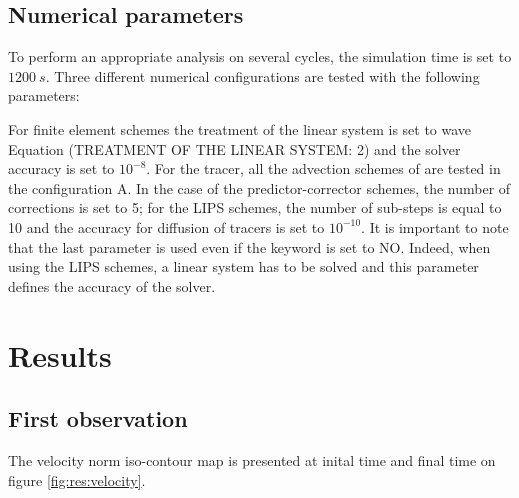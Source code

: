 \subsection{Numerical parameters}
\label{sec:num}
To perform an appropriate analysis on several cycles, the simulation time is set to $1200~s$.
Three different numerical configurations are tested with the following parameters:
\begin{table}[H]
  \caption{List of the simulation parameters used for the six cases tested in the Thacker example.}
  \label{tab:thacker:cases}
\end{table}

For finite element schemes the treatment of the linear system is set to wave Equation (TREATMENT OF THE LINEAR SYSTEM: 2) and the solver accuracy is set to $10^{-8}$.
For the tracer, all the advection schemes of  are tested in the configuration A.
In the case of the predictor-corrector schemes, the number of corrections is set to 5; for the LIPS schemes, the number of sub-steps is equal to 10 and the accuracy for diffusion of tracers is set to $10^{-10}$. It is important to note that the last parameter is used even if the keyword  is set to NO. Indeed, when using the LIPS schemes, a linear system has to be solved and this parameter defines the accuracy of the solver.


\section{Results}

\subsection{First observation}

The velocity norm iso-contour map is presented at inital time and final time on figure \ref{fig:res:velocity}.

